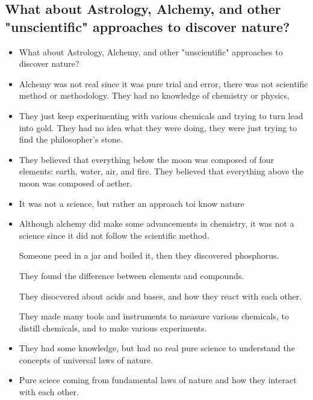 \documentclass{article}
\begin{document}
\subsection{What about Astrology, Alchemy, and other "unscientific" approaches to discover nature?}
\begin{itemize}
  \item What about Astrology, Alchemy, and other "unscientific" approaches
    to discover nature?

  \item Alchemy was not real since it was pure trial and error,
    there was not scientific method or methodology.
    They had no knowledge of chemistry or physics,
  \item They just keep experimenting with various chemicals
    and trying to turn lead into gold.
    They had no idea what they were doing, they were just
    trying to find the philosopher's stone.
  \item They believed that everything below the moon was composed of four elements:
    earth, water, air, and fire.
    They believed that everything above the moon was composed of aether.
  \item It was not a science, but rather an approach toi know nature
  \item Although alchemy did make some advancements in chemistry,
    it was not a science since it did not follow the scientific method.

    Someone peed in a jar and boiled it, then they discovered phosphorus.

    They found the difference between elements and compounds.

    They disocvered about acids and bases, and how they react with each other.

    They made many tools and instruments to measure various chemicals, to distill
    chemicals, and to make various experiments.
  \item They had some knowledge, but had no real pure science to understand the concepts
    of universal laws of nature.
  \item Pure sciece coming from fundamental laws of nature
    and how they interact with each other.
\end{itemize}
\end{document}
